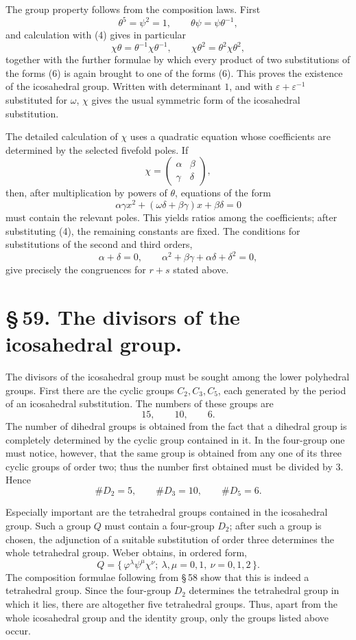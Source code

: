 \documentclass[11pt]{article}
\providecommand{\eps}{\varepsilon}
\providecommand{\eps}{\varepsilon}
\providecommand{\mat}[4]{\begin{pmatrix}#1&#2\\#3&#4\end{pmatrix}}
\providecommand{\mat}[4]{\begin{pmatrix}#1&#2\\#3&#4\end{pmatrix}}
\begin{document}
The group property follows from the composition laws. First
\begin{equation}
 \theta^5=\psi^2=1,\qquad \theta\psi=\psi\theta^{-1},
\tag{7}
\end{equation}
and calculation with (4) gives in particular
\begin{equation}
 \chi\theta=\theta^{-1}\chi\theta^{-1},\qquad
 \chi\theta^2=\theta^2\chi\theta^2,
\tag{8}
\end{equation}
together with the further formulae by which every product of two substitutions of the forms (6) is again brought to one of the forms (6). This proves the existence of the icosahedral group. Written with determinant $1$, and with $\eps+\eps^{-1}$ substituted for $\omega$, $\chi$ gives the usual symmetric form of the icosahedral substitution.

The detailed calculation of $\chi$ uses a quadratic equation whose coefficients are determined by the selected fivefold poles. If
\[
 \chi=\mat{\alpha}{\beta}{\gamma}{\delta},
\]
then, after multiplication by powers of $\theta$, equations of the form
\[
 \alpha\gamma x^2+(\omega\delta+\beta\gamma)x+\beta\delta=0
\]
must contain the relevant poles. This yields ratios among the coefficients; after substituting (4), the remaining constants are fixed. The conditions for substitutions of the second and third orders,
\[
 \alpha+\delta=0,\qquad
 \alpha^2+\beta\gamma+\alpha\delta+\delta^2=0,
\]
give precisely the congruences for $r+s$ stated above.

\section*{\S\,59. The divisors of the icosahedral group.}

The divisors of the icosahedral group must be sought among the lower polyhedral groups. First there are the cyclic groups $C_2,C_3,C_5$, each generated by the period of an icosahedral substitution. The numbers of these groups are
\[
 15,\qquad 10,\qquad 6.
\]
The number of dihedral groups is obtained from the fact that a dihedral group is completely determined by the cyclic group contained in it. In the four-group one must notice, however, that the same group is obtained from any one of its three cyclic groups of order two; thus the number first obtained must be divided by $3$. Hence
\[
 \#D_2=5,\qquad \#D_3=10,\qquad \#D_5=6.
\]

Especially important are the tetrahedral groups contained in the icosahedral group. Such a group $Q$ must contain a four-group $D_2$; after such a group is chosen, the adjunction of a suitable substitution of order three determines the whole tetrahedral group. Weber obtains, in ordered form,
\begin{equation}
 Q=\{\,\varphi^\lambda\psi^\mu\chi^\nu;\ \lambda,\mu=0,1,\ \nu=0,1,2\,\}.
\tag{1}
\end{equation}
The composition formulae following from \S\,58 show that this is indeed a tetrahedral group. Since the four-group $D_2$ determines the tetrahedral group in which it lies, there are altogether five tetrahedral groups. Thus, apart from the whole icosahedral group and the identity group, only the groups listed above occur.
\end{document}
